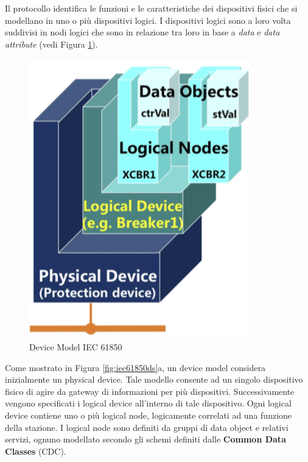 Il protocollo identifica le funzioni e le caratteristiche dei dispositivi fisici che si modellano in uno o più dispositivi logici. I dispositivi logici sono a loro volta suddivisi in nodi logici che sono in relazione tra loro in base a \emph{data} e \emph{data attribute} (vedi Figura \ref{fig:iec61850ln}).
\begin{figure}[h]
	\centering
	\includegraphics[scale=0.350]{imgs/iec61850ln.png}
	\caption{Device Model IEC 61850} \label{fig:iec61850ln}
\end{figure}
\newpage
Come mostrato in Figura \ref{fig:iec61850ds}a, un device model considera inizialmente un physical device. Tale modello consente ad un singolo dispositivo fisico di agire da gateway di informazioni per più dispositivi. Successivamente vengono specificati i logical device all'interno di tale dispositivo. Ogni logical device contiene uno o più logical node, logicamente correlati ad una funzione della stazione. I logical node sono definiti da gruppi di data object e relativi servizi, ognuno modellato secondo gli schemi definiti dalle \textbf{Common Data Classes} (CDC).\newline
